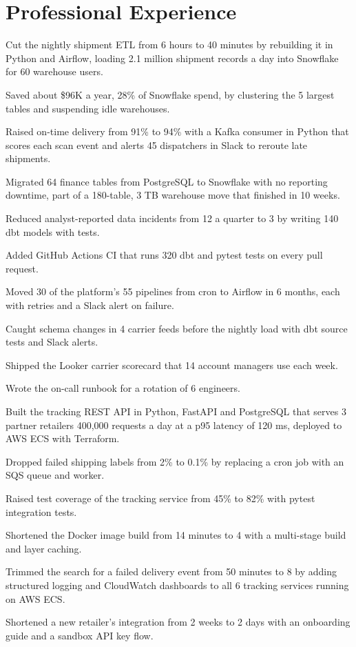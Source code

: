 \documentclass{resume}
\begin{document}
\section{Professional Experience}
\begin{bullets}
  \item Cut the nightly shipment ETL from 6 hours to 40 minutes by rebuilding it in Python and Airflow, loading 2.1 million shipment records a day into Snowflake for 60 warehouse users.
  \item Saved about \$96K a year, 28\% of Snowflake spend, by clustering the 5 largest tables and suspending idle warehouses.
  \item Raised on-time delivery from 91\% to 94\% with a Kafka consumer in Python that scores each scan event and alerts 45 dispatchers in Slack to reroute late shipments.
  \item Migrated 64 finance tables from PostgreSQL to Snowflake with no reporting downtime, part of a 180-table, 3 TB warehouse move that finished in 10 weeks.
  \item Reduced analyst-reported data incidents from 12 a quarter to 3 by writing 140 dbt models with tests.
  \item Added GitHub Actions CI that runs 320 dbt and pytest tests on every pull request.
  \item Moved 30 of the platform's 55 pipelines from cron to Airflow in 6 months, each with retries and a Slack alert on failure.
  \item Caught schema changes in 4 carrier feeds before the nightly load with dbt source tests and Slack alerts.
  \item Shipped the Looker carrier scorecard that 14 account managers use each week.
  \item Wrote the on-call runbook for a rotation of 6 engineers.
\end{bullets}

\begin{bullets}
  \item Built the tracking REST API in Python, FastAPI and PostgreSQL that serves 3 partner retailers 400,000 requests a day at a p95 latency of 120 ms, deployed to AWS ECS with Terraform.
  \item Dropped failed shipping labels from 2\% to 0.1\% by replacing a cron job with an SQS queue and worker.
  \item Raised test coverage of the tracking service from 45\% to 82\% with pytest integration tests.
  \item Shortened the Docker image build from 14 minutes to 4 with a multi-stage build and layer caching.
  \item Trimmed the search for a failed delivery event from 50 minutes to 8 by adding structured logging and CloudWatch dashboards to all 6 tracking services running on AWS ECS.
  \item Shortened a new retailer's integration from 2 weeks to 2 days with an onboarding guide and a sandbox API key flow.
\end{bullets}
\end{document}
